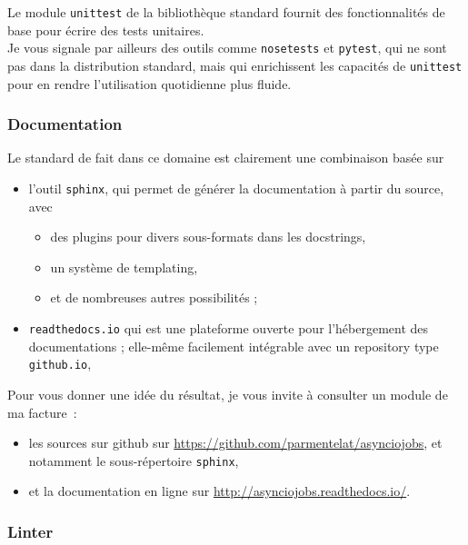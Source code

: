     Le module \texttt{unittest} de la bibliothèque standard fournit des
fonctionnalités de base pour écrire des tests unitaires.\\

Je vous signale par ailleurs des outils comme \texttt{nosetests} et
\texttt{pytest}, qui ne sont pas dans la distribution standard, mais qui
enrichissent les capacités de \texttt{unittest} pour en rendre
l'utilisation quotidienne plus fluide.

    \hypertarget{documentation}{%
\subsubsection{Documentation}\label{documentation}}

    Le standard de fait dans ce domaine est clairement une combinaison basée
sur

\begin{itemize}
\tightlist
\item
  l'outil \texttt{sphinx}, qui permet de générer la documentation à
  partir du source, avec

  \begin{itemize}
  \tightlist
  \item
    des plugins pour divers sous-formats dans les docstrings,
  \item
    un système de templating,
  \item
    et de nombreuses autres possibilités ;
  \end{itemize}
\item
  \texttt{readthedocs.io} qui est une plateforme ouverte pour
  l'hébergement des documentations ; elle-même facilement intégrable
  avec un repository type \texttt{github.io},
\end{itemize}

Pour vous donner une idée du résultat, je vous invite à consulter un
module de ma facture~:

\begin{itemize}
\tightlist
\item
  les sources sur github sur
  \url{https://github.com/parmentelat/asynciojobs}, et notamment le
  sous-répertoire \texttt{sphinx},
\item
  et la documentation en ligne sur
  \url{http://asynciojobs.readthedocs.io/}.
\end{itemize}

    \hypertarget{linter}{%
\subsubsection{Linter}\label{linter}}


